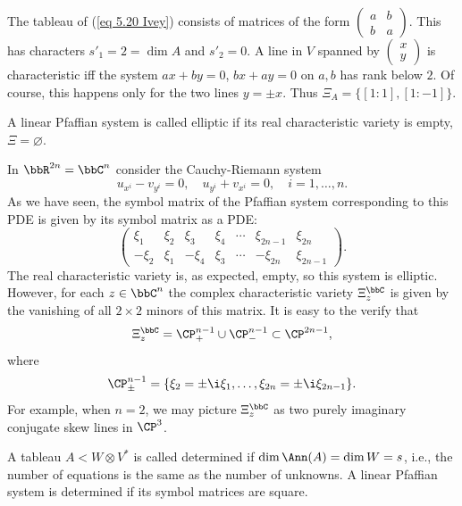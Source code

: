 \begin{example}
    The tableau of (\ref{eq 5.20 Ivey}) consists of matrices of the form $\left(\begin{smallmatrix}
        a&b\\b&a
    \end{smallmatrix}\right)$. This has characters $s'_1=2=\dim A$ and $s'_2=0$. A line in $V$ spanned by $\left(\begin{smallmatrix}
        x\\ y
    \end{smallmatrix}\right)$ is characteristic iff the system $ax+by=0$, $bx+ay=0$ on $a,b$ has rank below $2$. Of course, this happens only for the two lines $y=\pm x$. Thus $\Xi_A=\{[1:1],[1:-1]\}$. 
\end{example}

\begin{defn}
    A linear Pfaffian system is called elliptic if its real characteristic variety is empty, $\Xi=\varnothing$.
\end{defn}

\begin{example}\label{example cauchy-riemann char variety}
    In $\bbR^{2n}=\bbC^n$ consider the Cauchy-Riemann system 
    \[u_{x^i}-v_{y^i}=0,\quad u_{y^i}+v_{x^i}=0,\quad i=1,\ldots,n.\]
    As we have seen, the symbol matrix of the Pfaffian system corresponding to this PDE is given by its symbol matrix as a PDE:
    \[\begin{pmatrix}
        \xi_1 & \xi_2 & \xi_3 & \xi_4 & \cdots & \xi_{2n-1} & \xi_{2n}\\
        -\xi_2 & \xi_1 & -\xi_4 & \xi_3 & \cdots & -\xi_{2n}& \xi_{2n-1} 
    \end{pmatrix}.\]
    The real characteristic variety is, as expected, empty, so this system is elliptic. However, for each $z\in\bbC^n$ the complex characteristic variety $\Xi^\bbC_z$ is given by the vanishing of all $2\times 2$ minors of this matrix. It is easy to the verify that 
    \[\Xi_z^\bbC=\CP_+^{n-1}\cup \CP^{n-1}_-\subset \CP^{2n-1},\]
    where 
    \[\CP^{n-1}_\pm =\{\xi_2=\pm \i \xi_1,\ldots,\xi_{2n}=\pm \i \xi_{2n-1}\}.\]
    For example, when $n=2$, we may picture $\Xi_z^\bbC$ as two purely imaginary conjugate skew lines in $\CP^3$.
\end{example}


\begin{defn}
    A tableau $A<W\otimes V^\ast$ is called determined if $\dim \Ann(A)=\dim W=s$, i.e., the number of equations is the same as the number of unknowns. A linear Pfaffian system is determined if its symbol matrices are square. 
\end{defn}

